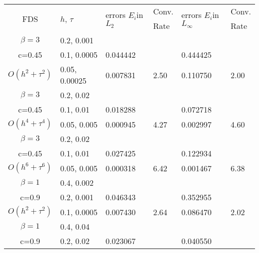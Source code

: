 \documentclass{article}
\begin{document}
\begin{table}[ht]
\centering
\small
		\begin{tabular}{||c|l|ll|ll||}
			\hline
			\hline
      \multirow{2  }{*}{FDS}        & \multirow{2  }{*}{$h$, $\tau$}  & \multirow{ 2 }{*}{errors $E_i$in$L_2$}  &Conv.& \multirow{2  }{*}{errors $E_i$in$L_\infty$}  &Conv.  \\
	                                        &                                                     &                                                                 &  Rate &                                                                       & Rate \\
   			\hline 
					\hline 
  $\beta=3$                &0.2, 0.001         &              &            &                     &      \\
   c=0.45                     &0.1, 0.0005         &0.044442  &            &0.444425 &       \\
     $O(h^2 + \tau^ 2)$ &0.05, 0.00025  & 0.007831 & 2.50      & 0.110750     & 2.00      \\
			\hline 
  $\beta=3$               &0.2, 0.02       &                &            &                     &      \\
   c=0.45                    &0.1, 0.01      &0.018288 &            &0.072718   &       \\
     $O(h^4+ \tau^4)$ &0.05, 0.005  &0.000945 &4.27    &0.002997   &4.60      \\
			\hline 
  $\beta=3$               &0.2, 0.02       &                &            &                      &            \\
     c=0.45                 &0.1, 0.01        &0.027425 &            &  0.122934    &           \\
     $O(h^6+ \tau^6)$ &0.05, 0.005 &0.000318 & 6.42     & 0.001467     &6.38   \\
	   \hline
			\hline 
       $\beta=1$       &0.4, 0.002        &             &            &           &   \\
                  c=0.9    &0.2, 0.001       &  0.046343   &            &0.352955 &   \\
  $O(h^2+ \tau^2)$ &0.1, 0.0005   &0.007430   &2.64  &0.086470  & 2.02 \\
			\hline
      $\beta=1$               &0.4, 0.04    &            &               &             &    \\
       c=0.9                     &0.2, 0.02     & 0.023067   &        &  0.040550   &   \\

\end{tabular}
\end{table}
\end{document}
